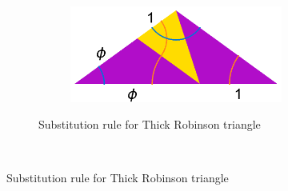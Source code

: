 \documentclass[
  oneside,
  11pt, a4paper,
  footinclude=true,
  headinclude=true,
  cleardoublepage=empty
]{scrbook}
\begin{document}
\begin{figure}[H]
        \centering
        \begin{subfigure}[t]{\textwidth}
        \begin{subfigure}[t]{0.4\textwidth}
                \centering
        \end{subfigure}\hfill \raisebox{30px}{\huge$\rightarrow$} \hfill%
        ~ %
        \begin{subfigure}[t]{0.4\textwidth}
                \centering
                \includegraphics[scale=0.4]{RobFatSub}
        \end{subfigure}
        \caption{Substitution rule for Thick Robinson triangle}
        \label{fig:RobSubThick}
        \end{subfigure}
        ~ %
          

\end{figure}
\end{document}
